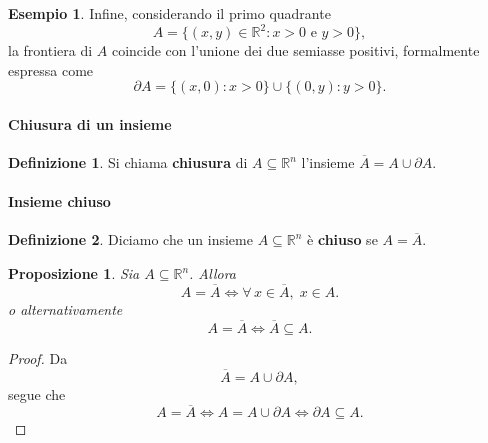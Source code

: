 \documentclass{article}
\theoremstyle{plain}
\newtheorem{prop}[thm]{Proposizione}
\theoremstyle{definition}
\newtheorem{defn}{Definizione}[section]
\newtheorem{exmp}{Esempio}[section]
\theoremstyle{remark}
\begin{document}
\vspace{10pt}

\begin{exmp}
    Infine, considerando il primo quadrante
    \[
    A = \{(x,y) \in \mathbb{R}^2 : x>0 \text{ e } y>0\},
    \]
    la frontiera di \( A \) coincide con l'unione dei due semiasse positivi, formalmente espressa come
    \[
    \partial A = \{(x,0) : x > 0\} \cup \{(0,y) : y > 0\}.
    \]
\end{exmp}

\vspace{10pt}

\paragraph{Chiusura di un insieme}
\begin{bxthm}
\begin{defn}
    Si chiama \textbf{chiusura} di $A\subseteq\mathbb{R}^n$ l'insieme $\overline{A}=A\cup\partial A$. 
\end{defn}
\end{bxthm}

\vspace{10pt}

\paragraph{Insieme chiuso}
\begin{bxthm}
\begin{defn}
    Diciamo che un insieme $A\subseteq\mathbb{R}^n$ è \textbf{chiuso} se $A=\overline{A}$.
\end{defn}
\end{bxthm}

\vspace{10pt}

\begin{bxthm}
\begin{prop}
    Sia $A\subseteq\mathbb{R}^n$.
    Allora 
    \[A=\overline{A}\iff\forall\,x\in\overline{A},\;x\in A.\]
    o alternativamente
    \[A=\overline{A}\iff\overline{A}\subseteq A.\]
\end{prop}
\end{bxthm}
\begin{proof}
    Da
    \[\overline{A}=A\cup\partial A,\]
    segue che 
    \[A=\overline{A}\iff A=A\cup \partial A \iff\partial A\subseteq A.\]
\end{proof}

\vspace{10pt}
\end{document}
